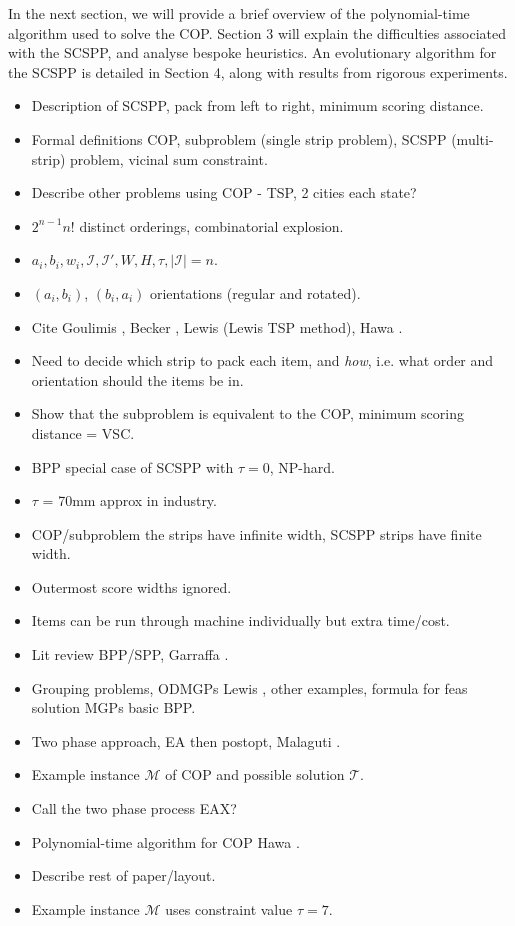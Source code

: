 \documentclass{elsarticle}
\begin{document}
In the next section, we will provide a brief overview of the polynomial-time algorithm used to solve the COP. Section 3 will explain the difficulties associated with the SCSPP, and analyse bespoke heuristics. An evolutionary algorithm for the SCSPP is detailed in Section 4, along with results from rigorous experiments.  

\begin{itemize}
	\item Description of SCSPP, pack from left to right, minimum scoring distance.
	\item Formal definitions COP, subproblem (single strip problem), SCSPP (multi-strip) problem, vicinal sum constraint.
	\item Describe other problems using COP - TSP, 2 cities each state?
	\item $2^{n-1} n!$ distinct orderings, combinatorial explosion.
	\item $a_i, b_i, w_i, \mathcal{I}, \mathcal{I}', W, H, \tau, |\mathcal{I}| = n$.
	\item $(a_i, b_i)$, $(b_i, a_i)$ orientations (regular and rotated).
	\item Cite Goulimis \cite{goulimis2004}, Becker \cite{becker2015}, Lewis \cite{lewis2011} (Lewis TSP method), Hawa \cite{hawa2018}.
	\item Need to decide which strip to pack each item, and \emph{how}, i.e. what order and orientation should the items be in.
	\item Show that the subproblem is equivalent to the COP, minimum scoring distance = VSC.
	\item BPP special case of SCSPP with $\tau = 0$, NP-hard.
	\item $\tau$ = 70mm approx in industry. 
	\item COP/subproblem the strips have infinite width, SCSPP strips have finite width.
	\item Outermost score widths ignored.
	\item Items can be run through machine individually but extra time/cost.
	\item Lit review BPP/SPP, Garraffa \cite{garraffa2016}.
	\item Grouping problems, ODMGPs Lewis \cite{lewis2009}, other examples, formula for feas solution MGPs basic BPP.
	\item Two phase approach, EA then postopt, Malaguti \cite{malaguti2008}.
	\item Example instance $\mathcal{M}$ of COP and possible solution $\mathcal{T}$.
	\item Call the two phase process EAX?
	\item Polynomial-time algorithm for COP Hawa \cite{hawa2018}.
	\item Describe rest of paper/layout.
	\item Example instance $\mathcal{M}$ uses constraint value $\tau = 7$.
\end{itemize}
\end{document}

